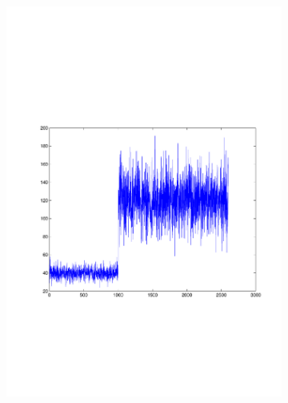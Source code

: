 \begin{figure}
\begin{subfigure}[c]{0.5\textwidth}
	\includegraphics[trim = 25mm 75mm 15mm 90mm, clip, width=\textwidth]{matlab/statfig_30}
\end{subfigure}
\begin{subfigure}[c]{0.5\textwidth}

\end{subfigure}
\end{figure}

